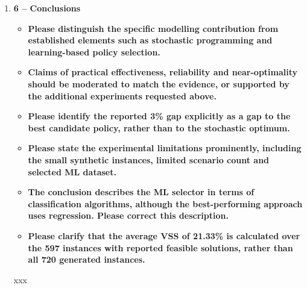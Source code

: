 \documentclass[11pt]{article}
\begin{document}
\begin{enumerate}
\begin{itemize}
We have revised Section 5.4 to clarify the role of the Ideal-policy and have modified the discussion of the computational results and the conclusions to avoid interpreting the gap to this benchmark as a measure of near-optimality for the WCRP-TVSD.


\item \textbf{Please compare the ML-selected solutions directly with reliable stochastic-model
reference values where available, alongside the comparison with the Ideal-policy.}

Alessio

\item \textbf{Table 7 should include end-to-end computational times for the ML approaches and
relevant baselines. Since the candidate policies have substantially different runtimes, executing one policy does not by itself establish the claimed computational advantage.}
\item \textbf{Please interpret training and test results separately. The combined OVERALL results do
not provide evidence of generalisation, and claims of reliable performance should reflect
the limited evaluation.}
\end{itemize}

Alessio
 
\vspace{1mm}
xxx

\item \textbf{6 -- Conclusions}
\begin{itemize}
\item \textbf{Please distinguish the specific modelling contribution from established elements such as stochastic programming and learning-based policy selection.}
\item \textbf{Claims of practical effectiveness, reliability and near-optimality should be moderated to
match the evidence, or supported by the additional experiments requested above.}
\item \textbf{Please identify the reported 3\% gap explicitly as a gap to the best candidate policy,
rather than to the stochastic optimum.}
\item \textbf{Please state the experimental limitations prominently, including the small synthetic
instances, limited scenario count and selected ML dataset.}
\item \textbf{The conclusion describes the ML selector in terms of classification algorithms, although
the best-performing approach uses regression. Please correct this description.}
\item \textbf{Please clarify that the average VSS of 21.33\% is calculated over the 597 instances with
reported feasible solutions, rather than all 720 generated instances.}
\end{itemize}
 
\vspace{1mm}
xxx
 	
\end{enumerate}
\end{document}
